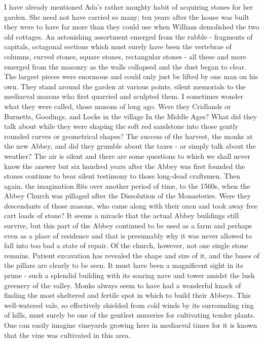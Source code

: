 I have already mentioned Ada's rather naughty habit of acquiring stones for her garden. She need not have carried so many; ten years after the house was built they were to have far more than they could use when William demolished the two old cottages. An astonishing assortment emerged from the rubble - fragments of capitals, octagonal sections which must surely have been the vertebrae of columns, curved stones, square stones, rectangular stones - all these and more emerged from the masonry as the walls collapsed and the dust began to clear. The largest pieces were enormous and could only just be lifted by one man on his own. They stand around the garden at various points, silent memorials to the mediaeval masons who first quarried and sculpted them. I sometimes wonder what they were called, those masons of long ago. Were they Cridlands or Burnetts, Goodings, and Locks in the village In the Middle Ages? What did they talk about while they were shaping the soft red sandstone into those gently rounded curves or geometrical shapes? The success of the harvest, the monks at the new Abbey, and did they grumble about the taxes - or simply talk about the weather? The air is silent and there are some questions to which we shall never know the answer but six hundred years after the Abbey was first founded the stones continue to bear silent testimony to those long-dead craftsmen. Then again, the imagination flits over another period of time, to the 1560s, when the Abbey Church was pillaged after the Dissolution of the Monasteries. Were they descendants of those masons, who came along with their oxen and took away free cart loads of stone? It seems a miracle that the actual Abbey buildings still survive, but this part of the Abbey continued to be used as a farm and perhaps even as a place of residence and that is presumably why it was never allowed to fall into too bad a state of repair. Of the church, however, not one single stone remains. Patient excavation has revealed the shape and size of it, and the bases of the pillars are clearly to be seen. It must have been a magnificent sight in its prime - such a splendid building with its soaring nave and tower amidst the lush greenery of the valley. Monks always seem to have had a wonderful knack of finding the most sheltered and fertile spot in which to build their Abbeys. This well-watered vale, so effectively shielded from cold winds by its surrounding ring of hills, must surely be one of the gentlest nurseries for cultivating tender plants. One can easily imagine vineyards growing here in mediaeval times for it is known that the vine was cultivated in this area.

